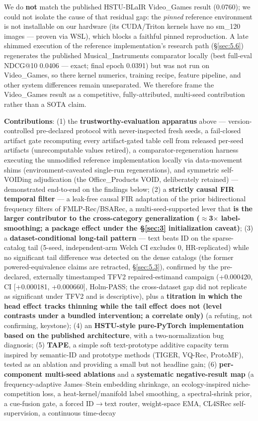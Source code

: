 We do \textbf{not} match the published HSTU-BLaIR Video\_Games result (0.0760); we could not isolate the cause of that residual gap: the \emph{pinned} reference environment is not installable on our hardware (its CUDA/Triton kernels have no sm\_120 images --- proven via WSL), which blocks a faithful pinned reproduction. A late shimmed execution of the reference implementation's research path (\S\ref{sec:5.6}) regenerates the published Musical\_Instruments comparator locally (best full-eval NDCG@10 0.0406 --- exact; final epoch 0.0391) but was not run on Video\_Games, so there kernel numerics, training recipe, feature pipeline, and other system differences remain unseparated. We therefore frame the Video\_Games result as a competitive, fully-attributed, multi-seed contribution rather than a SOTA claim.

\textbf{Contributions}: (1) the \textbf{trustworthy-evaluation apparatus} above --- version-controlled pre-declared protocol with never-inspected fresh seeds, a fail-closed artifact gate recomputing every artifact-gated table cell from released per-seed artifacts (unrecomputable values retired), a comparator-regeneration harness executing the unmodified reference implementation locally via data-movement shims (environment-caveated single-run regenerations), and symmetric self-VOIDing adjudication (the Office\_Products VOID, deliberately retained) --- demonstrated end-to-end on the findings below; (2) a \textbf{strictly causal FIR temporal filter} --- a leak-free causal FIR adaptation of the prior bidirectional frequency filters of FMLP-Rec/BSARec, a multi-seed-supported lever that \textbf{is the larger contributor to the cross-category generalization (\ensuremath{\approx}3\ensuremath{\times} label-smoothing; a package effect under the \S\ref{sec:3} initialization caveat)}; (3) a \textbf{dataset-conditional long-tail pattern} --- text beats ID on the sparse-catalog tail (5-seed, independent-arm Welch CI excludes 0, HR-replicated) while no significant tail difference was detected on the dense catalogs (the former powered-equivalence claims are retracted, \S\ref{sec:5.3}), confirmed by the pre-declared, externally timestamped TFV2 repaired-estimand campaign (+0.000420, CI {[}+0.000181, +0.000660{]}, Holm-PASS; the cross-dataset gap did not replicate as significant under TFV2 and is descriptive), plus a \textbf{titration in which the head effect tracks thinning while the tail effect does not (level contrasts under a bundled intervention; a correlate only)} (a refuting, not confirming, keystone); (4) an \textbf{HSTU-style pure-PyTorch implementation based on the published architecture}, with a two-normalization bug diagnosis; (5) \textbf{TAPE}, a simple soft text-prototype additive capacity term inspired by semantic-ID and prototype methods (TIGER, VQ-Rec, ProtoMF), tested as an ablation and providing a small but not headline gain; (6) \textbf{per-component multi-seed ablations} and a \textbf{systematic negative-result map} (a frequency-adaptive James--Stein embedding shrinkage, an ecology-inspired niche-competition loss, a heat-kernel/manifold label smoothing, a spectral-shrink prior, a cue-fusion gate, a forced ID\ensuremath{\rightarrow}text router, weight-space EMA, CL4SRec self-supervision, a continuous time-decay 